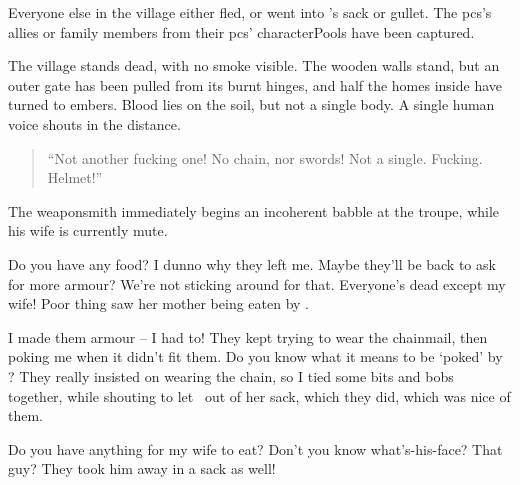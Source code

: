 Everyone else in the \gls{village} either fled, or went into 's sack or gullet.
The \glspl{pc}'s allies or family members from their \glspl{pc}' \glspl{characterPool} have been captured.

\begin{boxtext}
  The \gls{village} stands dead, with no smoke visible.
  The wooden walls stand, but an outer gate has been pulled from its burnt hinges, and half the homes inside have turned to embers.
  Blood lies on the soil, but not a single body.
  A single human voice shouts in the distance.

  \begin{quotation}
    ``Not another fucking one!
    No chain, nor swords!
    Not a single. Fucking. Helmet!''
  \end{quotation}
\end{boxtext}


The weaponsmith immediately begins an incoherent babble at the troupe, while his wife is currently mute.

\begin{speechtext}
  Do you have any food?
  I dunno why they left me.
  Maybe they'll be back to ask for more armour?
  We're not sticking around for that.
  Everyone's dead except my wife!
  Poor thing saw her mother being eaten by .

  I made them armour -- I had to!
  They kept trying to wear the chainmail, then poking me when it didn't fit them.
  Do you know what it means to be `poked' by ?
  They really insisted on wearing the chain, so I tied some bits and bobs together, while shouting to let \composeHumanName\ out of her sack, which they did, which was nice of them.

  Do you have anything for my wife to eat?
  Don't you know what's-his-face?
  That guy?
  They took him away in a sack as well!
\end{speechtext}



